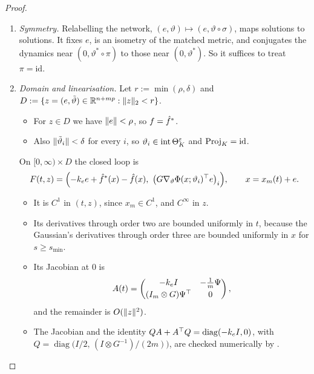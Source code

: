 \begin{proof}\mbox{}
\begin{enumerate}[label=\arabic*.]
  \item \emph{Symmetry.} Relabelling the network, $(e,\vartheta)\mapsto(e,\vartheta\circ\sigma)$, maps solutions to
    solutions. It fixes $e$, is an isometry of the matched metric, and conjugates the dynamics near
    $(0,\vartheta^*\circ\pi)$ to those near $(0,\vartheta^*)$. So it suffices to treat $\pi=\mathrm{id}$.

  \item \emph{Domain and linearisation.} Let $r:=\min(\rho,\delta)$ and
    $D:=\{z=(e,\tilde\vartheta)\in\mathbb{R}^{n+mp}:\lVert z\rVert_2<r\}$.
    \begin{itemize}
      \item For $z\in D$ we have $\lVert e\rVert<\rho$, so $f=\hat f^*$.
      \item Also $\lVert \tilde\vartheta_i\rVert<\delta$ for every $i$, so $\vartheta_i\in\operatorname{int}\Theta_K^{\varepsilon}$ and
        $\operatorname{Proj}_K=\mathrm{id}$.
    \end{itemize}
    On $[0,\infty)\times D$ the closed loop is
    \[
      F(t,z)=\Bigl(-k_ee+\fhat^*(x)-\fhat(x),\ \bigl(G\nabla_\vartheta\Phi(x;\vartheta_i)^\T e\bigr)_i\Bigr),
      \qquad x=x_m(t)+e.
    \]
    \begin{itemize}
      \item It is $C^1$ in $(t,z)$, since $x_m\in C^1$, and $C^\infty$ in $z$.
      \item Its derivatives through order two are bounded uniformly in $t$, because the Gaussian's derivatives through
        order three are bounded uniformly in $x$ for $s\ge s_{\min}$.
      \item Its Jacobian at $0$ is
        \[
          A(t)=\begin{pmatrix}-k_eI&-\frac1m\Psi\\[2pt](I_m\otimes G)\Psi^\top&0\end{pmatrix},
        \]
        and the remainder is $O(\lVert z\rVert^2)$.
      \item The Jacobian and the identity $QA+A^\top Q=\operatorname{diag}(-k_eI,0)$, with
        $Q=\operatorname{diag}\bigl(I/2,\,(I\otimes G^{-1})/(2m)\bigr)$, are checked numerically by\newline
        .
    \end{itemize}


\end{enumerate}
\end{proof}
